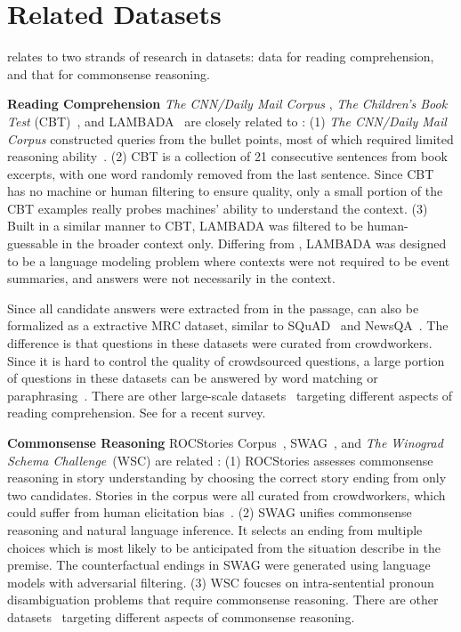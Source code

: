\section{Related Datasets}
\label{sec:related-datasets}

\ReCoRD relates to two strands of research in datasets: data for reading comprehension, and that for commonsense reasoning.

\noindent\textbf{Reading Comprehension}
\emph{The CNN/Daily Mail Corpus} \cite{deepmind-cnn-dailymail}, \emph{The Children's Book Test} (CBT)~\cite{cbt}, and LAMBADA~\cite{lambada} are closely related to \ReCoRD:
(1) \emph{The CNN/Daily Mail Corpus} constructed queries from the bullet points, most of which required limited reasoning ability~\cite{exam-of-cnn-dailymail}.
(2) CBT is a collection of 21 consecutive sentences from book excerpts, with one
word randomly removed from the last sentence.
Since CBT has no machine or human filtering to ensure quality,
only a small portion of the CBT examples really probes machines' ability to understand the context.
(3) Built in a similar manner to CBT, LAMBADA was filtered to be human-guessable in the broader context only.
Differing from \ReCoRD, LAMBADA was designed to be a language modeling problem where contexts were not required to be event summaries, and answers were not necessarily in the context.

Since all candidate answers were extracted from in the passage, \ReCoRD can also be formalized as a extractive MRC dataset,
similar to SQuAD~\cite{squad} and NewsQA~\cite{newsqa}.
The difference is that questions in these datasets were curated from crowdworkers.
Since it is hard to control the quality of crowdsourced questions, a large portion of questions in these datasets can be answered by word matching or paraphrasing~\cite{adversarial-squad,squad-v2,adversarial-training}. 
There are other large-scale datasets~\cite{msmarco,triviaqa,race,searchqa,narrativeqa,coqa,quac,hotpotqa} targeting different aspects of reading comprehension. See \cite{gaosurvey} for a recent survey.

\noindent\textbf{Commonsense Reasoning}
ROCStories Corpus~\cite{rocstories}, SWAG~\cite{swag}, and \emph{The Winograd Schema Challenge}~(WSC) \cite{wsc} are related \ReCoRD:
(1) ROCStories assesses commonsense reasoning in story understanding by choosing the correct story ending from only two candidates. Stories in the corpus were all curated from crowdworkers, which could suffer from human elicitation bias~\cite{reporting-bias,vision-reporting-bias,joci}.
(2) SWAG unifies commonsense reasoning and natural language inference. 
It selects an ending from multiple choices which is most likely to be anticipated from the situation describe in the premise.
The counterfactual endings in SWAG were generated using language models with adversarial filtering.
(3) WSC foucses on intra-sentential pronoun disambiguation problems that require commonsense reasoning.
There are other datasets~\cite{copa,joci,naive-psychology-in-stories,event2mind} targeting different aspects of commonsense reasoning.

